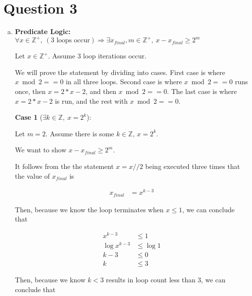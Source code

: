 \documentclass[12pt]{article}
\begin{document}
\section*{Question 3}
\begin{enumerate}[a.]
    \item

    \textbf{Predicate Logic:} $\forall x \in \mathbb{Z}^{+},\:(\text{3 loops occur})
    \Rightarrow \exists x_{final},m \in \mathbb{Z}^{+},\:x - x_{final} \geq 2^m$

    \bigskip

    Let $x \in \mathbb{Z}^{+}$. Assume 3 loop iterations occur.

    \bigskip

    We will prove the statement by dividing into cases. First case is where
    $x \bmod 2 == 0$ in all three loops. Second case is where $x \bmod 2 ==0$
    runs once, then $x = 2*x - 2$, and then $x \bmod 2 ==0$. The last case is where
    $x = 2*x - 2$ is run, and the rest with $x \bmod 2 == 0$.

    \bigskip

    \textbf{Case 1} ($\exists k \in \mathbb{Z},\:x = 2^k$):

    \bigskip

    Let $m = 2$. Assume there is some $k \in \mathbb{Z}$, $x = 2^k$.

    \bigskip

    We want to show $x - x_{final} \geq 2^m$.

    \bigskip

    It follows from the the statement $x = x // 2$ being executed three
    times that the value of $x_{final}$ is

    \setcounter{equation}{0}
    \begin{align}
        x_{final} &= x^{k-3}
    \end{align}

    \bigskip

    Then, because we know the loop terminates when $x \leq 1$, we can conclude that

    \begin{align}
        x^{k-3} &\leq 1\\
        \log x^{k-3} &\leq \log 1\\
        k-3 &\leq 0\\
        k &\leq 3
    \end{align}

    \bigskip

    Then, because we know $k < 3$ results in loop count less than 3, we can conclude
    that


\end{enumerate}
\end{document}
